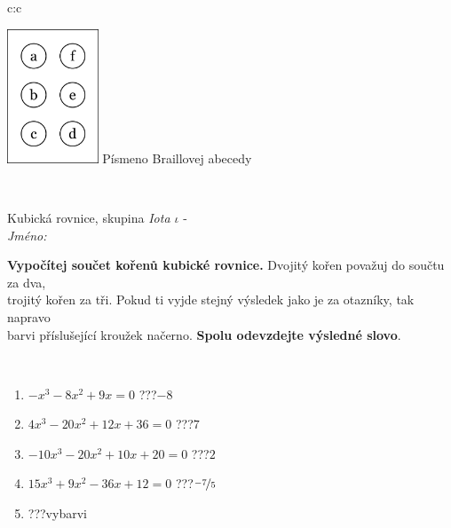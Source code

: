 \documentclass[10pt]{report}
\begin{document}
\begin{tabular}{c:c}
\begin{minipage}[c][104.5mm][t]{0.5\linewidth}
\begin{center}
\begin{minipage}{0.20\linewidth}
\begin{center}
\includegraphics[height=40mm]{../images/braille.png}
{\small Písmeno Braillovej abecedy}
\end{center}
\end{minipage}
\end{center}
\end{minipage}
\\ \hdashline
\begin{minipage}[c][104.5mm][t]{0.5\linewidth}
\begin{center}
\vspace{7mm}
{\huge Kubická rovnice, skupina \textit{Iota $\iota$} -}\\[5mm]
\textit{Jméno:}\phantom{xxxxxxxxxxxxxxxxxxxxxxxxxxxxxxxxxxxxxxxxxxxxxxxxxxxxxxxxxxxxxxxxx}\\[5mm]
\begin{minipage}{0.95\linewidth}
\begin{center}
\textbf{Vypočítej součet kořenů kubické rovnice.} Dvojitý kořen považuj do součtu za dva,\\trojitý kořen za tři. Pokud ti vyjde stejný výsledek jako je za otazníky, tak napravo\\barvi příslušející kroužek načerno. \textbf{Spolu odevzdejte výsledné slovo}.
\end{center}
\end{minipage}
\\[1mm]
\begin{minipage}{0.79\linewidth}
\begin{center}
\begin{varwidth}{\linewidth}
\begin{enumerate}
\Large
\item $-x^3-8x^2+9x=0$\quad \dotfill\; ???\;\dotfill \quad $-8$
\item $4x^3-20x^2+12x+36=0$\quad \dotfill\; ???\;\dotfill \quad $7$
\item $-10x^3-20x^2+10x+20=0$\quad \dotfill\; ???\;\dotfill \quad $2$
\item $15x^3+9x^2-36x+12=0$\quad \dotfill\; ???\;\dotfill \quad $\nicefrac{-7}{5}$
\item \quad \dotfill\; ???\;\dotfill \quad vybarvi

\end{enumerate}
\end{varwidth}
\end{center}
\end{minipage}
\end{center}
\end{minipage}
\end{tabular}
\end{document}
